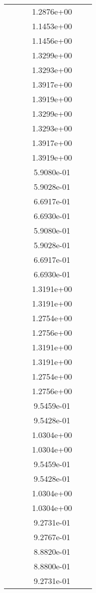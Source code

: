 \begin{xltabular}{\textwidth}{r|rS[table-format=1.3e+2]S[table-format=1.4e+2]S[table-format=1.4e+2]S[table-format=-1.5]}
&  &  & 1.2876e+00 & & \\
&  &  & 1.1453e+00 & & \\
&  &  & 1.1456e+00 & & \\
&  &  & 1.3299e+00 & & \\
&  &  & 1.3293e+00 & & \\
&  &  & 1.3917e+00 & & \\
&  &  & 1.3919e+00 & & \\
&  &  & 1.3299e+00 & & \\
&  &  & 1.3293e+00 & & \\
&  &  & 1.3917e+00 & & \\
&  &  & 1.3919e+00 & & \\
&  &  & 5.9080e-01 & & \\
&  &  & 5.9028e-01 & & \\
&  &  & 6.6917e-01 & & \\
&  &  & 6.6930e-01 & & \\
&  &  & 5.9080e-01 & & \\
&  &  & 5.9028e-01 & & \\
&  &  & 6.6917e-01 & & \\
&  &  & 6.6930e-01 & & \\
&  &  & 1.3191e+00 & & \\
&  &  & 1.3191e+00 & & \\
&  &  & 1.2754e+00 & & \\
&  &  & 1.2756e+00 & & \\
&  &  & 1.3191e+00 & & \\
&  &  & 1.3191e+00 & & \\
&  &  & 1.2754e+00 & & \\
&  &  & 1.2756e+00 & & \\
&  &  & 9.5459e-01 & & \\
&  &  & 9.5428e-01 & & \\
&  &  & 1.0304e+00 & & \\
&  &  & 1.0304e+00 & & \\
&  &  & 9.5459e-01 & & \\
&  &  & 9.5428e-01 & & \\
&  &  & 1.0304e+00 & & \\
&  &  & 1.0304e+00 & & \\
&  &  & 9.2731e-01 & & \\
&  &  & 9.2767e-01 & & \\
&  &  & 8.8820e-01 & & \\
&  &  & 8.8800e-01 & & \\
&  &  & 9.2731e-01 & & \\

\end{xltabular}
